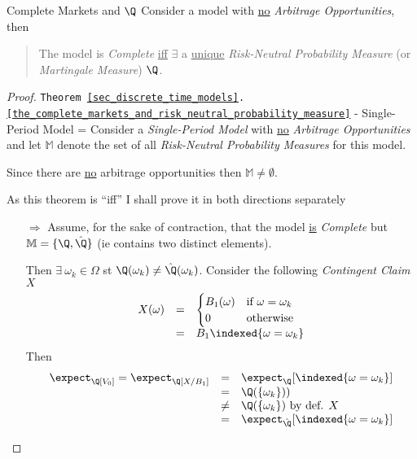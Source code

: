 \documentclass[11pt,a4paper]{article}
\begin{document}
  \begin{theorem}{Complete Markets and $\Q$}\label{the_complete_markets_and_risk_neutral_probability_measure}
    Consider a model with \underline{no} \textit{Arbitrage Opportunities}, then
    \begin{quote}
      The model is \textit{Complete} \underline{iff} $\exists$ a \underline{unique} \textit{Risk-Neutral Probability Measure} (or \textit{Martingale Measure}) $\Q$.
    \end{quote}
  \end{theorem}

  \begin{proof}{\texttt{Theorem \ref{sec_discrete_time_models}.\ref{the_complete_markets_and_risk_neutral_probability_measure}} - Single-Period Model}
    \everymath={\displaystyle}
    Consider a \textit{Single-Period Model} with \underline{no} \textit{Arbitrage Opportunities} and let $\mathbb{M}$ denote the set of all \textit{Risk-Neutral Probability Measures} for this model.
    \par Since there are \underline{no} arbitrage opportunities then $\mathbb{M}\neq\emptyset$.
    \par As this theorem is ``iff'' I shall prove it in both directions separately
    \begin{itemize}
      \item[$\Longrightarrow$] Assume, for the sake of contraction, that the model \underline{is} \textit{Complete} but $\mathbb{M}=\{\Q,\hat\Q\}$  (ie contains two distinct elements).
      \par Then $\exists\ \omega_k\in\Omega$ st $\Q(\omega_k)\neq\hat\Q(\omega_k)$. Consider the following \textit{Contingent Claim} $X$
      \[\begin{array}{rcl}
      X(\omega)&=&\begin{cases} B_1(\omega)&\text{if }\omega=\omega_k\\0&\text{otherwise}\end{cases}\\
      &=&B_1\indexed\{\omega=\omega_k\}
      \end{array}\]
      Then
      \[\begin{array}{rcl}
        \expect_\Q[V_0]=\expect_\Q[X/B_1]&=&\expect_\Q[\indexed\{\omega=\omega_k\}]\\
        &=&\Q(\{\omega_k\}))\\
        &\neq&\Q(\{\omega_k\})\text{ by def. }X\\
        &=&\expect_{\hat\Q}[\indexed\{\omega=\omega_k\}]\\

\end{array}\]
\end{itemize}
\end{proof}
\end{document}
